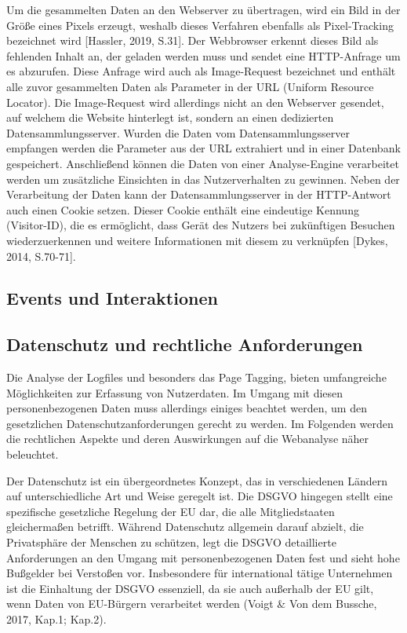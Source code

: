 Um die gesammelten Daten an den Webserver zu übertragen, wird ein Bild in der Größe eines Pixels erzeugt, weshalb dieses Verfahren ebenfalls als Pixel-Tracking bezeichnet wird [Hassler, 2019, S.31]. Der Webbrowser erkennt dieses Bild als fehlenden Inhalt an, der geladen werden muss und sendet eine HTTP-Anfrage um es abzurufen. Diese Anfrage wird auch als Image-Request bezeichnet und enthält alle zuvor gesammelten Daten als Parameter in der URL (Uniform Resource Locator). Die Image-Request wird allerdings nicht an den Webserver gesendet, auf welchem die Website hinterlegt ist, sondern an einen dedizierten Datensammlungsserver. Wurden die Daten vom Datensammlungsserver empfangen werden die Parameter aus der URL extrahiert und in einer Datenbank gespeichert. Anschließend können die Daten von einer Analyse-Engine verarbeitet werden um zusätzliche Einsichten in das Nutzerverhalten zu gewinnen. Neben der Verarbeitung der Daten kann der Datensammlungsserver in der HTTP-Antwort auch einen Cookie setzen. Dieser Cookie enthält eine eindeutige Kennung (Visitor-ID), die es ermöglicht, dass Gerät des Nutzers bei zukünftigen Besuchen wiederzuerkennen und weitere Informationen mit diesem zu verknüpfen [Dykes, 2014, S.70-71].

\subsection{Events und Interaktionen}

\subsection{Datenschutz und rechtliche Anforderungen}
Die Analyse der Logfiles und besonders das Page Tagging, bieten umfangreiche Möglichkeiten zur Erfassung von Nutzerdaten. Im Umgang mit diesen personenbezogenen Daten muss allerdings einiges beachtet werden, um den gesetzlichen Datenschutzanforderungen gerecht zu werden. Im Folgenden werden die rechtlichen Aspekte und deren Auswirkungen auf die Webanalyse näher beleuchtet.

Der Datenschutz ist ein übergeordnetes Konzept, das in verschiedenen Ländern auf unterschiedliche Art und Weise geregelt ist. Die DSGVO hingegen stellt eine spezifische gesetzliche Regelung der EU dar, die alle Mitgliedstaaten gleichermaßen betrifft. Während Datenschutz allgemein darauf abzielt, die Privatsphäre der Menschen zu schützen, legt die DSGVO detaillierte Anforderungen an den Umgang mit personenbezogenen Daten fest und sieht hohe Bußgelder bei Verstoßen vor. Insbesondere für international tätige Unternehmen ist die Einhaltung der DSGVO essenziell, da sie auch außerhalb der EU gilt, wenn Daten von EU-Bürgern verarbeitet werden (Voigt \& Von dem Bussche, 2017, Kap.1; Kap.2).

